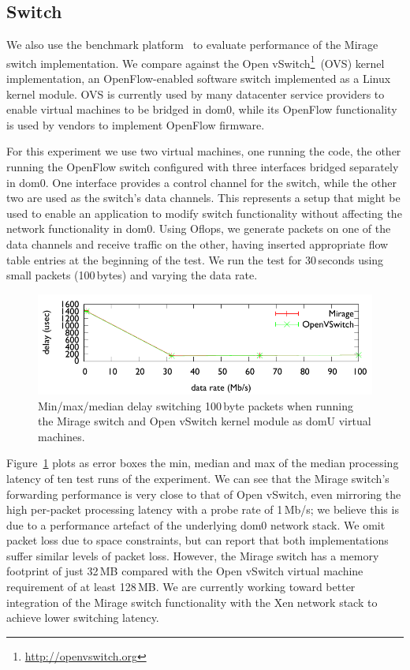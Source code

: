\subsection{\mirage Switch}

We also use the \oflops benchmark platform~\cite{oflops} to evaluate
performance of the Mirage switch implementation. We compare against the Open
vSwitch\footnote{\url{http://openvswitch.org}}~(OVS) kernel implementation, an
OpenFlow-enabled software switch implemented as a Linux kernel module. OVS is
currently used by many datacenter service providers to enable virtual machines
to be bridged in dom0, while its OpenFlow functionality is used by vendors to
implement OpenFlow firmware.

For this experiment we use two virtual machines, one running the \oflops code,
the other running the OpenFlow switch configured with three interfaces bridged
separately in dom0. One interface provides a control channel for the switch,
while the other two are used as the switch's data channels. This represents a
setup that might be used to enable an application to modify switch
functionality without affecting the network functionality in dom0. Using
Oflops, we generate packets on one of the data channels and receive traffic on
the other, having inserted appropriate flow table entries at the beginning of
the test. We run the test for 30\,seconds using small packets (100\,bytes) and
varying the data rate.

\begin{figure}
\centering
\includegraphics[width=\columnwidth]{switch-media-delay}
\caption{\label{fig:switch}Min/max/median delay switching 100\,byte packets
        when running the Mirage switch and Open vSwitch kernel module as domU
        virtual machines.}
\vspace{-2ex}
\end{figure}

Figure~\ref{fig:switch} plots as error boxes the min, median and max of the
median processing latency of ten test runs of the experiment. We can see that
the Mirage switch's forwarding performance is very close to that of Open
vSwitch, even mirroring the high per-packet processing latency with a probe
rate of 1\,Mb/s; we believe this is due to a performance artefact of the
underlying dom0 network stack. We omit packet loss due to space constraints,
but can report that both implementations suffer similar levels of packet loss.
However, the Mirage switch has a memory footprint of just 32\,MB compared with
the Open vSwitch virtual machine requirement of at least 128\,MB. We are
currently working toward better integration of the Mirage switch functionality
with the Xen network stack to achieve lower switching latency.

